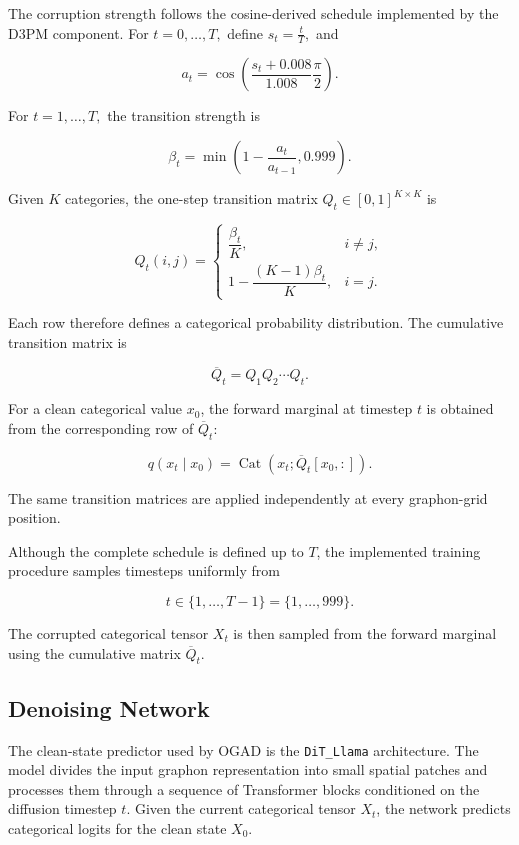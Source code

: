 The corruption strength follows the cosine-derived schedule implemented by the D3PM component. For $t=0,\ldots,T,$ define $s_t = \frac{t}{T},$ and

\[
a_t
=
\cos
\left(
\frac{s_t+0.008}{1.008}
\frac{\pi}{2}
\right).
\]

For $t=1,\ldots,T,$ the transition strength is

\[
\beta_t
=
\min
\left(
1-\frac{a_t}{a_{t-1}},
0.999
\right).
\]

Given \(K\) categories, the one-step transition matrix $Q_t\in[0,1]^{K\times K}$ is

\[
Q_t(i,j)
=
\begin{cases}
\dfrac{\beta_t}{K},
&
i\neq j,
\\[6pt]
1-\dfrac{(K-1)\beta_t}{K},
&
i=j.
\end{cases}
\]

Each row therefore defines a categorical probability distribution. The cumulative transition matrix is

\[
\overline{Q}_t
=
Q_1Q_2\cdots Q_t.
\]

For a clean categorical value \(x_0\), the forward marginal at timestep \(t\) is obtained from the corresponding row of \(\overline{Q}_t\):

\[
q(x_t\mid x_0)
=
\operatorname{Cat}
\left(
x_t;
\overline{Q}_t[x_0,:]
\right).
\]

The same transition matrices are applied independently at every graphon-grid position.

Although the complete schedule is defined up to \(T\), the implemented training procedure samples timesteps uniformly from

\[
t\in\{1,\ldots,T-1\}
=
\{1,\ldots,999\}.
\]

The corrupted categorical tensor \(X_t\) is then sampled from the forward marginal using the cumulative matrix \(\overline{Q}_t\).


\subsection{Denoising Network}
\label{subsec:method_d3pm_network}

The clean-state predictor used by OGAD is the \texttt{DiT\_Llama} architecture. The model divides the input graphon representation into small spatial patches and processes them through a sequence of Transformer blocks conditioned on the diffusion timestep \(t\). Given the current categorical tensor \(X_t\), the network predicts categorical logits for the clean state \(X_0\).

